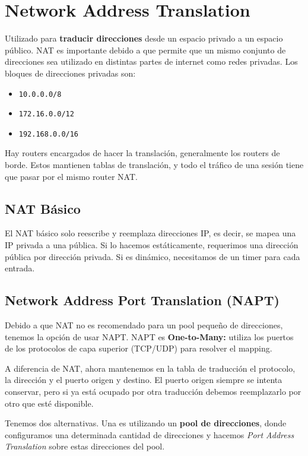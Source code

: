 \section{Network Address Translation}

Utilizado para \textbf{traducir direcciones} desde un espacio privado a un espacio público. NAT es importante debido a que permite que un mismo conjunto de direcciones sea utilizado en distintas partes de internet como redes privadas. Los bloques de direcciones privadas son:

\begin{itemize}[label=\textcolor{acento}{$\bullet$}]
    \item \texttt{10.0.0.0/8}
    \item \texttt{172.16.0.0/12}
    \item \texttt{192.168.0.0/16}
\end{itemize}

Hay routers encargados de hacer la translación, generalmente los routers de borde. Estos mantienen tablas de translación, y todo el tráfico de una sesión tiene que pasar por el mismo router NAT. 

\subsection{NAT Básico}

El NAT básico solo reescribe y reemplaza direcciones IP, es decir, se mapea una IP privada a una pública. Si lo hacemos estáticamente, requerimos una dirección pública por dirección privada. Si es dinámico, necesitamos de un timer para cada entrada.

\subsection{Network Address Port Translation (NAPT)}    

Debido a que NAT no es recomendado para un pool pequeño de direcciones, tenemos la opción de usar NAPT. NAPT es \textbf{One-to-Many:} utiliza los puertos de los protocolos de capa superior (TCP/UDP) para resolver el mapping. 

A diferencia de NAT, ahora mantenemos en la tabla de traducción el protocolo, la dirección y el puerto origen y destino. El puerto origen siempre se intenta conservar, pero si ya está ocupado por otra traducción debemos reemplazarlo por otro que esté disponible.

Tenemos dos alternativas. Una es utilizando un \textbf{pool de direcciones}, donde configuramos una determinada cantidad de direcciones y hacemos \emph{Port Address Translation} sobre estas direcciones del pool.

